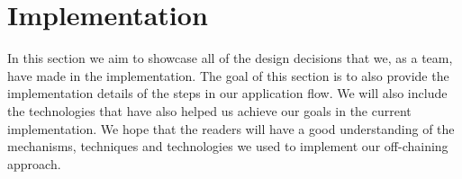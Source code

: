 \section{Implementation}
\label{sec:approach-implementation}

In this section we aim to showcase all of the design decisions that we, as a team, have made in the implementation. The goal of this section is to also provide the implementation details of the steps in our application flow. We will also include the technologies that have also helped us achieve our goals in the current implementation. We hope that the readers will have a good understanding of the mechanisms, techniques and technologies we used to implement our off-chaining approach.





